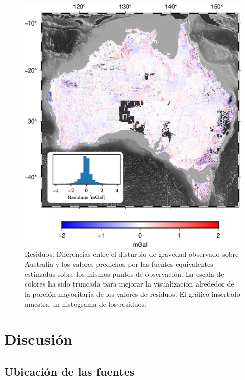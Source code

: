 \begin{figure}
    \centering
    \includegraphics[width=0.7\linewidth]{figs/eql-gradient-boosted/australia-residuals.png}
    \caption{
        Residuos.
        Diferencias entre el disturbio de gravedad observado sobre Australia
        y los valores predichos por las fuentes equivalentes estimadas sobre
        los mismos puntos de observación.
        La escala de colores ha sido truncada para mejorar la visualización
        alrededor de la porción mayoritaria de los valores de residuos.
        El gráfico insertado muestra un histograma de los residuos.
    }
    \label{fig:australia-residuals}
\end{figure}



\section{Discusión}

\subsection{Ubicación de las fuentes}

